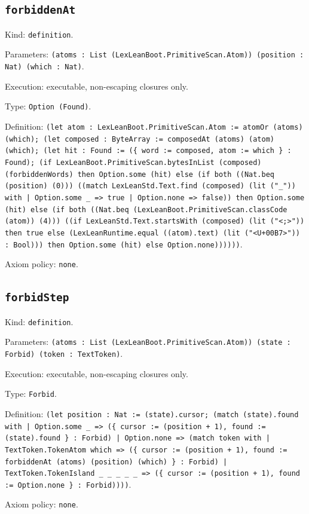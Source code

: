 \documentclass[11pt]{article}
\begin{document}
\subsection*{\texttt{forbiddenAt}}
\noindent Kind: \texttt{definition}.\par
\noindent Parameters: \texttt{(atoms : List (LexLeanBoot.PrimitiveScan.Atom)) (position : Nat) (which : Nat)}.\par
\noindent Execution: executable, non-escaping closures only.\par
\noindent Type: \texttt{Option (Found)}.\par
\noindent Definition: \texttt{(let atom : LexLeanBoot.PrimitiveScan.Atom := atomOr (atoms) (which); (let composed : ByteArray := composedAt (atoms) (atom) (which); (let hit : Found := (\{ word := composed, atom := which \} : Found); (if LexLeanBoot.PrimitiveScan.bytesInList (composed) (forbiddenWords) then Option.some (hit) else (if both ((Nat.beq (position) (0))) ((match LexLeanStd.Text.find (composed) (lit ("\_")) with | Option.some \_ => true | Option.none => false)) then Option.some (hit) else (if both ((Nat.beq (LexLeanBoot.PrimitiveScan.classCode (atom)) (4))) ((if LexLeanStd.Text.startsWith (composed) (lit ("<;>")) then true else (LexLeanRuntime.equal ((atom).text) (lit ("<U+00B7>")) : Bool))) then Option.some (hit) else Option.none))))))}.\par
\noindent Axiom policy: \texttt{none}.\par
\subsection*{\texttt{forbidStep}}
\noindent Kind: \texttt{definition}.\par
\noindent Parameters: \texttt{(atoms : List (LexLeanBoot.PrimitiveScan.Atom)) (state : Forbid) (token : TextToken)}.\par
\noindent Execution: executable, non-escaping closures only.\par
\noindent Type: \texttt{Forbid}.\par
\noindent Definition: \texttt{(let position : Nat := (state).cursor; (match (state).found with | Option.some \_ => (\{ cursor := (position + 1), found := (state).found \} : Forbid) | Option.none => (match token with | TextToken.TokenAtom which => (\{ cursor := (position + 1), found := forbiddenAt (atoms) (position) (which) \} : Forbid) | TextToken.TokenIsland \_ \_ \_ \_ \_ => (\{ cursor := (position + 1), found := Option.none \} : Forbid))))}.\par
\noindent Axiom policy: \texttt{none}.\par
\end{document}
